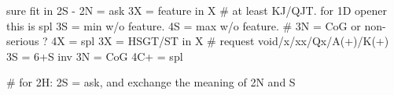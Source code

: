 sure fit in 2S - 
2N = ask
   3X = feature in X  # at least KJ/QJT. for 1D opener this is spl
   3S = min w/o feature. 4S = max w/o feature.  # 3N = CoG or non-serious ?
   4X = spl
3X = HSGT/ST in X  # request void/x/xx/Qx/A(+)/K(+)
3S = 6+S inv
3N = CoG
4C+ = spl

# for 2H: 2S = ask, and exchange the meaning of 2N and S